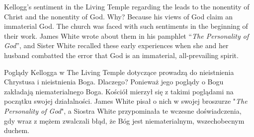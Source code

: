 Kellogg’s sentiment in the Living Temple regarding the  leads to the nonentity of Christ and the nonentity of God. Why? Because his views of God claim an immaterial God. The church was faced with such sentiments in the beginning of their work. James White wrote about them in his pamphlet “\textit{The Personality of God}”, and Sister White recalled these early experiences when she and her husband combatted the error that God is an immaterial, all-prevailing spirit.


Poglądy Kellogga w The Living Temple dotyczące  prowadzą do nieistnienia Chrystusa i nieistnienia Boga. Dlaczego? Ponieważ jego poglądy o Bogu zakładają niematerialnego Boga. Kościół mierzył się z takimi poglądami na początku swojej działalności. James White pisał o nich w swojej broszurze "\textit{The Personality of God}", a Siostra White przypominała te wczesne doświadczenia, gdy wraz z mężem zwalczali błąd, że Bóg jest niematerialnym, wszechobecnym duchem.
